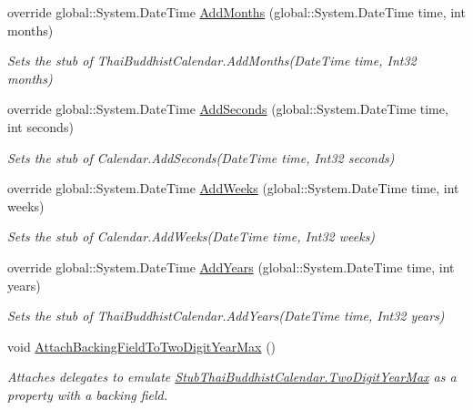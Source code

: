 \begin{DoxyCompactItemize}
override global\-::\-System.\-Date\-Time \hyperlink{class_system_1_1_globalization_1_1_fakes_1_1_stub_thai_buddhist_calendar_a33739dd86f8c8575f0989b841f9403a7}{Add\-Months} (global\-::\-System.\-Date\-Time time, int months)
\begin{DoxyCompactList}\small\item\em Sets the stub of Thai\-Buddhist\-Calendar.\-Add\-Months(\-Date\-Time time, Int32 months)\end{DoxyCompactList}\item 
override global\-::\-System.\-Date\-Time \hyperlink{class_system_1_1_globalization_1_1_fakes_1_1_stub_thai_buddhist_calendar_a3251f4fdb62da27785e9228a674d72cc}{Add\-Seconds} (global\-::\-System.\-Date\-Time time, int seconds)
\begin{DoxyCompactList}\small\item\em Sets the stub of Calendar.\-Add\-Seconds(\-Date\-Time time, Int32 seconds)\end{DoxyCompactList}\item 
override global\-::\-System.\-Date\-Time \hyperlink{class_system_1_1_globalization_1_1_fakes_1_1_stub_thai_buddhist_calendar_a90fa0553f59d5ddb2e5b784e486dabaf}{Add\-Weeks} (global\-::\-System.\-Date\-Time time, int weeks)
\begin{DoxyCompactList}\small\item\em Sets the stub of Calendar.\-Add\-Weeks(\-Date\-Time time, Int32 weeks)\end{DoxyCompactList}\item 
override global\-::\-System.\-Date\-Time \hyperlink{class_system_1_1_globalization_1_1_fakes_1_1_stub_thai_buddhist_calendar_a978f94d5989d804785c0a3c623028d32}{Add\-Years} (global\-::\-System.\-Date\-Time time, int years)
\begin{DoxyCompactList}\small\item\em Sets the stub of Thai\-Buddhist\-Calendar.\-Add\-Years(\-Date\-Time time, Int32 years)\end{DoxyCompactList}\item 
void \hyperlink{class_system_1_1_globalization_1_1_fakes_1_1_stub_thai_buddhist_calendar_a8a4887dbd2a898b089ebb5593bd64e2e}{Attach\-Backing\-Field\-To\-Two\-Digit\-Year\-Max} ()
\begin{DoxyCompactList}\small\item\em Attaches delegates to emulate \hyperlink{class_system_1_1_globalization_1_1_fakes_1_1_stub_thai_buddhist_calendar_a83e9c4e3d6c3803b1e41769383563b8b}{Stub\-Thai\-Buddhist\-Calendar.\-Two\-Digit\-Year\-Max} as a property with a backing field.\end{DoxyCompactList}\item 

\end{DoxyCompactItemize}
